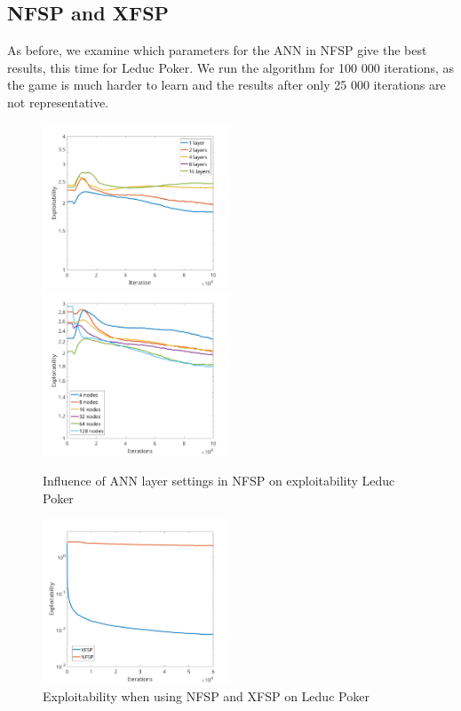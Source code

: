 \documentclass[10pt,a4paper]{article}
\begin{document}
\subsection{NFSP and XFSP}
As before, we examine which parameters for the ANN in NFSP give the best results, this time for Leduc Poker. We run the algorithm for 100 000 iterations, as the game is much harder to learn and the results after only 25 000 iterations are not representative.

\begin{center}
\begin{figure}[h]
\label{fig:layers_kuhn}
\includegraphics[width=0.5\textwidth]{Figures/leduc_layers.png}
\includegraphics[width=0.5\textwidth]{Figures/leduc_nodes.png}
\caption{Influence of ANN layer settings in NFSP on exploitability Leduc Poker}
\end{figure}
\end{center}


\begin{center}
	\begin{figure}[h]
	\centering
	\label{fig:layers_kuhn}
	\includegraphics[width=0.5\textwidth]{Figures/xfsp_nfsp_leduc.png}
	\caption{Exploitability when using NFSP and XFSP on Leduc Poker}
	\end{figure}
	\end{center}
\end{document}
